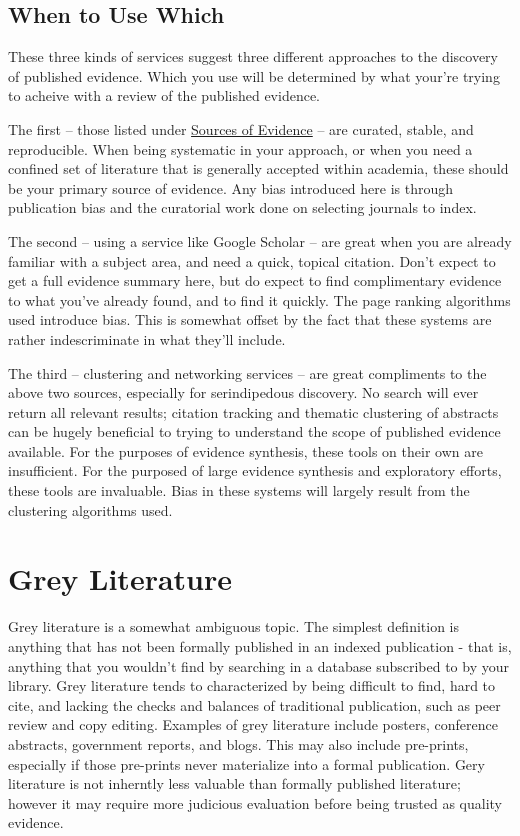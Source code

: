 \documentclass[
]{book}
\begin{document}
\subsection{When to Use Which}\label{when-to-use-which}

These three kinds of services suggest three different approaches to the discovery of published evidence. Which you use will be determined by what your're trying to acheive with a review of the published evidence.

The first -- those listed under \href{}{Sources of Evidence} -- are curated, stable, and reproducible. When being systematic in your approach, or when you need a confined set of literature that is generally accepted within academia, these should be your primary source of evidence. Any bias introduced here is through publication bias and the curatorial work done on selecting journals to index.

The second -- using a service like Google Scholar -- are great when you are already familiar with a subject area, and need a quick, topical citation. Don't expect to get a full evidence summary here, but do expect to find complimentary evidence to what you've already found, and to find it quickly. The page ranking algorithms used introduce bias. This is somewhat offset by the fact that these systems are rather indescriminate in what they'll include.

The third -- clustering and networking services -- are great compliments to the above two sources, especially for serindipedous discovery. No search will ever return all relevant results; citation tracking and thematic clustering of abstracts can be hugely beneficial to trying to understand the scope of published evidence available. For the purposes of evidence synthesis, these tools on their own are insufficient. For the purposed of large evidence synthesis and exploratory efforts, these tools are invaluable. Bias in these systems will largely result from the clustering algorithms used.

\section{Grey Literature}\label{grey-literature}

Grey literature is a somewhat ambiguous topic. The simplest definition is anything that has not been formally published in an indexed publication - that is, anything that you wouldn't find by searching in a database subscribed to by your library. Grey literature tends to characterized by being difficult to find, hard to cite, and lacking the checks and balances of traditional publication, such as peer review and copy editing. Examples of grey literature include posters, conference abstracts, government reports, and blogs. This may also include pre-prints, especially if those pre-prints never materialize into a formal publication. Gery literature is not inherntly less valuable than formally published literature; however it may require more judicious evaluation before being trusted as quality evidence.
\end{document}
